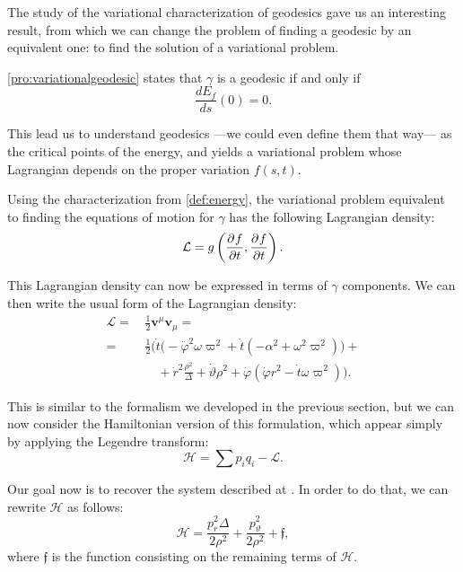 The study of the variational characterization of geodesics gave us an interesting result, from which we can change the problem of finding a geodesic by an equivalent one: to find the solution of a variational problem.

\autoref{pro:variationalgeodesic} states that $\gamma$ is a geodesic if and only if
\[
\frac{dE_f}{ds}(0) = 0.
\]

This lead us to understand geodesics ---we could even define them that way--- as the critical points of the energy, and yields a variational problem whose Lagrangian depends on the proper variation $f(s,t)$.

Using the characterization from \autoref{def:energy}, the variational problem equivalent to finding the equations of motion for $\gamma$ has the following Lagrangian density:
\begin{equation}
\label{eq:1stlagrangian}
\mathcal{L} = g\left( \frac{\partial^{} f}{\partial t}, \frac{\partial^{} f}{\partial t} \right).
\end{equation}

This Lagrangian density can now be expressed in terms of $\gamma$ components. We can then write the usual form of the Lagrangian density:
\begin{align}
\mathcal{L} =\,& \frac{1}{2} \mathbf{v}^\mu \mathbf{v}_\mu = \\
=\,& \frac{1}{2} \Biggl( \dot{t}\biggl( -\dot{\varphi}^2\omega\varpi^2 + \dot{t} \left( -\alpha^2 + \omega^2\varpi^2 \right) \biggr) +\\
&\quad + \dot{r}^2\frac{\rho^2}{\Delta} + \dot{\vartheta}\rho^2 + \dot{\varphi}\left( \dot{\varphi} r^2 - \dot{t} \omega \varpi^2 \right) \Biggr).
\end{align}

This is similar to the formalism we developed in the previous section, but we can now consider the Hamiltonian version of this formulation, which appear simply by applying the Legendre transform:
\begin{equation*}
\mathcal{H} = \sum p_i q_i - \mathcal{L}.
\end{equation*}

Our goal now is to recover the system described at \cite[Eq. (A.15)]{thorne15}. In order to do that, we can rewrite $\mathcal{H}$ as follows:
\begin{equation}
\label{eq:hamiltonian}
\mathcal{H} = \frac{p_r^2 \Delta}{2\rho^2} + \frac{p_\vartheta^2}{2\rho^2} + \mathfrak{f},
\end{equation}
where $\mathfrak{f}$ is the function consisting on the remaining terms of $\mathcal{H}$.


